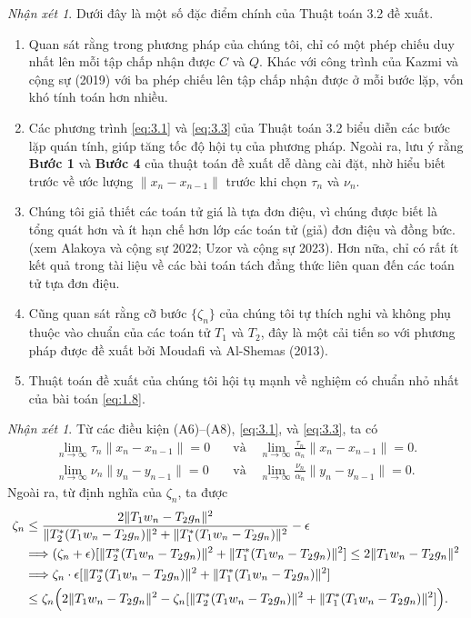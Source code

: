 \documentclass{MyBook}
\theoremstyle{plain}
\theoremstyle{definition}
\theoremstyle{remark}
\newtheorem{remark}[theorem]{Nhận xét}
\numberwithin{equation}{chapter}
\newcommand{\nm}[1]{\lVert #1\rVert}
\begin{document}
\begin{remark}
Dưới đây là một số đặc điểm chính của Thuật toán 3.2 đề xuất.
\begin{enumerate}[label=(\roman*)]
\item Quan sát rằng trong phương pháp của chúng tôi, chỉ có một phép chiếu duy nhất lên mỗi tập chấp nhận được $C$ và $Q$. Khác với công trình của Kazmi và cộng sự (2019) với ba phép chiếu lên tập chấp nhận được ở mỗi bước lặp, vốn khó tính toán hơn nhiều.
\item Các phương trình \eqref{eq:3.1} và \eqref{eq:3.3} của Thuật toán 3.2 biểu diễn các bước lặp quán tính, giúp tăng tốc độ hội tụ của phương pháp. Ngoài ra, lưu ý rằng \textbf{Bước 1} và \textbf{Bước 4} của thuật toán đề xuất dễ dàng cài đặt, nhờ hiểu biết trước về ước lượng $\nm{x_n-x_{n-1}}$ trước khi chọn $\tau_n$ và $\nu_n$.
\item Chúng tôi giả thiết các toán tử giá là tựa đơn điệu, vì chúng được biết là tổng quát hơn và ít hạn chế hơn lớp các toán tử (giả) đơn điệu và đồng bức. (xem Alakoya và cộng sự 2022; Uzor và cộng sự 2023). Hơn nữa, chỉ có rất ít kết quả trong tài liệu về các bài toán tách đẳng thức liên quan đến các toán tử tựa đơn điệu.
\item Cũng quan sát rằng cỡ bước $\{\zeta_n\}$ của chúng tôi tự thích nghi và không phụ thuộc vào chuẩn của các toán tử $T_1$ và $T_2$, đây là một cải tiến so với phương pháp được đề xuất bởi Moudafi và Al-Shemas (2013).
\item Thuật toán đề xuất của chúng tôi hội tụ mạnh về nghiệm có chuẩn nhỏ nhất của bài toán \eqref{eq:1.8}.
\end{enumerate}
\end{remark}

\begin{remark}\label{rem:3.4}
Từ các điều kiện (A6)--(A8), \eqref{eq:3.1}, và \eqref{eq:3.3}, ta có
\begin{align}
\lim_{n\to\infty}\tau_n\nm{x_n-x_{n-1}}=0 &\quad\text{và}\quad \lim_{n\to\infty}\frac{\tau_n}{\alpha_n}\nm{x_n-x_{n-1}}=0. \label{eq:3.5}\\
\lim_{n\to\infty}\nu_n\nm{y_n-y_{n-1}}=0 &\quad\text{và}\quad \lim_{n\to\infty}\frac{\nu_n}{\alpha_n}\nm{y_n-y_{n-1}}=0. \label{eq:3.6}
\end{align}
Ngoài ra, từ định nghĩa của $\zeta_n$, ta được
\begin{align}
\zeta_n &\le \frac{2\nm{T_1w_n-T_2g_n}^2}{\nm{T_2^{*}(T_1w_n-T_2g_n)}^2+\nm{T_1^{*}(T_1w_n-T_2g_n)}^2}-\epsilon\notag\\
&\Longrightarrow (\zeta_n+\epsilon)[\nm{T_2^{*}(T_1w_n-T_2g_n)}^2+\nm{T_1^{*}(T_1w_n-T_2g_n)}^2]\le 2\nm{T_1w_n-T_2g_n}^2\notag\\
&\Longrightarrow \zeta_n\cdot\epsilon[\nm{T_2^{*}(T_1w_n-T_2g_n)}^2+\nm{T_1^{*}(T_1w_n-T_2g_n)}^2]\notag\\
&\le \zeta_n\Bigl(2\nm{T_1w_n-T_2g_n}^2-\zeta_n[\nm{T_2^{*}(T_1w_n-T_2g_n)}^2+\nm{T_1^{*}(T_1w_n-T_2g_n)}^2]\Bigr). \label{eq:3.7}
\end{align}
\end{remark}
\end{document}
